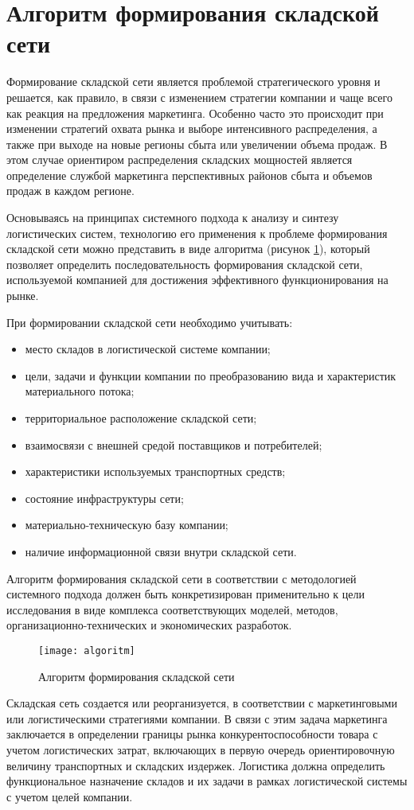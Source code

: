 \section{Алгоритм формирования складской сети}

Формирование складской сети является проблемой стратегического уровня и решается, как правило, в связи с изменением стратегии компании и чаще всего как реакция на предложения маркетинга.
Особенно часто это происходит при изменении стратегий охвата рынка и выборе интенсивного распределения, а также при выходе на новые регионы сбыта или увеличении объема продаж.
В этом случае ориентиром распределения складских мощностей является определение службой маркетинга перспективных районов сбыта и объемов продаж в каждом регионе.

Основываясь на принципах системного подхода к анализу и синтезу логистических систем, технологию его применения к проблеме формирования складской сети можно представить в виде алгоритма (рисунок \ref{fig:algoritm}), который позволяет определить последовательность формирования складской сети, используемой компанией для достижения эффективного функционирования на рынке.


При формировании складской сети необходимо учитывать:
\begin{itemize}
	\item место складов в логистической системе компании;
	\item цели, задачи и функции компании по преобразованию вида и характеристик материального потока;
	\item территориальное расположение складской сети;
	\item взаимосвязи с внешней средой поставщиков и потребителей;
	\item характеристики используемых транспортных средств;
	\item состояние инфраструктуры сети;
	\item материально-техническую базу компании;
	\item наличие информационной связи внутри складской сети.
\end{itemize}

Алгоритм формирования складской сети в соответствии с методологией системного подхода должен быть конкретизирован применительно к цели исследования в виде комплекса соответствующих моделей, методов, организационно-технических и экономических разработок.

\begin{figure}[h]
	\centering
	\texttt{[image: algoritm]}
	\caption{Алгоритм формирования складской сети}
	\label{fig:algoritm}
\end{figure}

Складская сеть создается или реорганизуется, в соответствии с маркетинговыми или логистическими стратегиями компании.
В связи с этим задача маркетинга заключается в определении границы рынка конкурентоспособности товара с учетом логистических затрат, включающих в первую очередь ориентировочную величину транспортных и складских издержек.
Логистика должна определить функциональное назначение складов и их задачи в рамках логистической системы с учетом целей компании.
